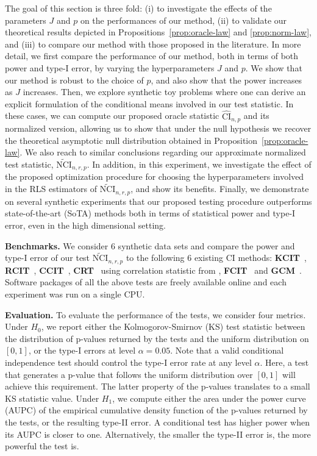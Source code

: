 The goal of this section is three fold: (i) to investigate the effects of the parameters $J$ and $p$ on the performances of our method, (ii) to validate our theoretical results depicted in Propositions~\ref{prop:oracle-law} and \ref{prop:norm-law}, and (iii) to compare our method with those proposed in the literature. In more detail, we first compare the performance of our method, both in terms of both power and type-I error, by varying the hyperparameters $J$ and $p$. We show that our method is robust to the choice of $p$, and also show that the power increases as $J$ increases. Then, we explore synthetic toy problems where one can derive an explicit formulation of the conditional means involved in our test statistic. In these cases, we can compute our proposed oracle statistic $\widehat{\text{CI}}_{n,p}$ and its normalized version, allowing us to show that under the null hypothesis we recover the theoretical asymptotic null distribution obtained in Proposition~\ref{prop:oracle-law}. We also reach to similar conclusions regarding our approximate normalized test statistic, $\widetilde{\text{NCI}}_{n,r,p}$. In addition, in this experiment, we investigate the effect of the proposed optimization procedure for choosing the hyperparameters involved in the RLS estimators of $\widetilde{\text{NCI}}_{n,r,p}$, and show its benefits. Finally, we demonstrate on several synthetic experiments that our proposed testing procedure outperforms state-of-the-art (SoTA) methods both in terms of statistical power and type-I error, even in the high dimensional setting. 




\textbf{Benchmarks.} We consider 6 synthetic data sets and compare the power and type-I error of our test $\widetilde{\text{NCI}}_{n,r,p}$ to the following 6 existing CI methods: \textbf{KCIT}~\citep{zhang2012kernel}, \textbf{RCIT}~\citep{strobl2019approximate}, \textbf{CCIT}~\citep{sen2017modelpowered}, \textbf{CRT}~\citep{candes2018panning} using correlation statistic from \citep{BellotS19}, \textbf{FCIT}~\citep{chalupka2018fast} and \textbf{GCM}~\citep{gcm2020}. Software packages of all the above tests are freely available online and each experiment was run on a single CPU. 





\textbf{Evaluation.} To evaluate the performance of the tests, we consider four metrics. Under $H_0$, we report either the Kolmogorov-Smirnov (KS) test statistic between the distribution of p-values returned by the tests and the uniform distribution on $[0,1]$, or the type-I errors at level $\alpha=0.05$. Note that a valid conditional independence test should control the type-I error rate at any level $\alpha$. Here, a test that generates a p-value that follows the uniform distribution over $[0,1]$ will achieve this requirement. The latter property of the p-values translates to a small KS statistic value. Under $H_1$, we compute either the area under the power curve (AUPC) of the empirical cumulative density function of the p-values returned by the tests, or the resulting type-II error. A conditional test has higher power when its AUPC is closer to one. Alternatively, the smaller the type-II error is, the more powerful the test is.

